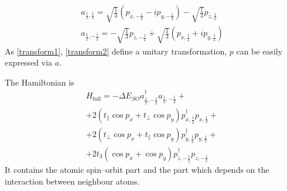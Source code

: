 \documentclass{article}
\begin{document}
\begin{equation}
	\label{transform2}
	\begin{gathered}
		a_{\frac{1}{2}, \frac{1}{2}} = 
			\sqrt{\frac{1}{3}}\left(p_{x, -\frac{1}{2}} - ip_{y,-\frac{1}{2}}\right) - 
				\sqrt{\frac{1}{3}} p_{z,\frac{1}{2}}\\
		a_{\frac{1}{2}, -\frac{1}{2}} = 
			-\sqrt{\frac{1}{3}} p_{z,-\frac{1}{2}} + 
				\sqrt{\frac{1}{3}}\left(p_{x, \frac{1}{2}} + ip_{y,\frac{1}{2}}\right)
	\end{gathered}
\end{equation}
As \eqref{transform1}, \eqref{transform2} define a unitary transformation, $p$ can be easily
expressed via $a$.

The Hamiltonian is
\begin{multline}
	H_{\mathrm{full}} = -\Delta E_{SO} 
			a_{\frac{1}{2}, -\frac{1}{2}}^\dagger a_{\frac{1}{2}, -\frac{1}{2}}
			+\\
			+2 (t_{\parallel} \cos{p_x} + t_{\perp} \cos{p_y})
				p_{x,\frac 12}^\dagger p_{x,\frac 12}+\\
			+2(t_{\perp} \cos{p_x} + t_{\parallel} \cos{p_y})
				p_{y,\frac 12}^\dagger p_{y,\frac 12} +\\
			+2t_{3}( \cos{p_x} + \cos{p_y})
				p_{z,-\frac 12}^\dagger p_{z,-\frac 12} 
\end{multline}
It contains the atomic spin--orbit part and the part which depends on the interaction between
neighbour atoms.
\end{document}
